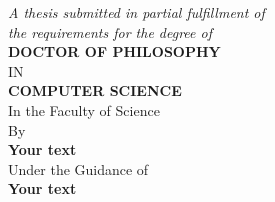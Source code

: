\documentclass[
11pt, %
english, %
onehalfspacing, %
nolistspacing, %
liststotoc, %
toctotoc, %
headsepline, %
]{MastersDoctoralThesis} %
\author{Your text} %
\theoremstyle{definition}
\begin{document}
\linespread{1}
\frontmatter %

\pagestyle{plain} %


\begin{titlepage}
\begin{center}

\vspace*{.02\textheight}

{\huge  \bfseries \ttitle} %
\vspace*{.06\textheight}

\large
\textit{A thesis submitted in partial fulfillment of \\
the requirements for the degree of}
\vspace*{.04\textheight} \\
\textbf{DOCTOR OF PHILOSOPHY}
\vspace*{.01\textheight} \\
IN
\vspace*{.01\textheight} \\
\textbf{COMPUTER SCIENCE}
 \vspace*{.02\textheight} \\
In the Faculty of Science\\ [0.3cm] %

\vspace*{.04\textheight}
By 
\vspace*{.01\textheight} \\
\textbf{\Large {Your text}}
\vspace*{.02\textheight} \\
Under the Guidance of 
\vspace*{.01\textheight} \\
\textbf{Your text}


\end{center}
\end{titlepage}
\end{document}
